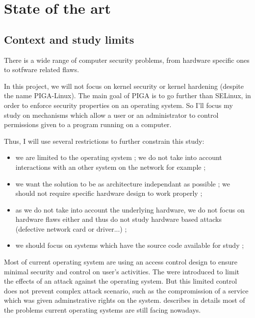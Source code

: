 \documentclass[pdftex,a4paper,titlepage,11pt]{article}
\begin{document}

\newpage

\section{State of the art}

\subsection{Context and study limits}


There is a wide range of computer security problems, from hardware specific ones to sotfware related flaws.

\bigskip

In this project, we will not focus on kernel security or kernel hardening (despite the name PIGA-Linux). The main goal of PIGA is to go further than SELinux, in order to enforce security properties on an operating system. So I'll focus my study on mechanisms which allow a user or an administrator to control permissions given to a program running on a computer.

\bigskip

Thus, I will use several restrictions to further constrain this study:
\begin{itemize}
	\item we are limited to the operating system ; we do not take into account interactions with an other system on the network for example ;
	\item we want the solution to be as architecture independant as possible ; we should not require specific hardware design to work properly ;
	\item as we do not take into account the underlying hardware, we do not focus on hardware flaws either and thus do not study hardware based attacks (defective network card or driver...) ;
	\item we should focus on systems which have the source code available for study ;
\end{itemize}

\smallskip

Most of current operating system are using an access control design to ensure minimal security and control on user's activities. The were introduced to limit the effects of an attack against the operating system. But this limited control does not prevent complex attack scenario, such as the compromission of a service which was given adminstrative rights on the system. \cite{NSATIOF} describes in details most of the problems current operating systems are still facing nowadays.
\end{document}
